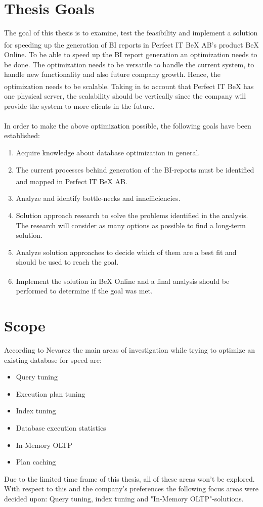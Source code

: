 \documentclass{cslthse-msc}
\newcommand{\bex}{BeX\textsuperscript{\textregistered} }
\begin{document}
\section{Thesis Goals} \label{sec:goals}
The goal of this thesis is to examine, test the feasibility and implement a solution for speeding up the generation of BI reports in Perfect IT \bex AB's product \bex Online. To be able to speed up the BI report generation an optimization needs to be done. The optimization needs to be versatile to handle the current system, to handle new functionality and also future company growth. Hence, the optimization needs to be scalable. Taking in to account that Perfect IT \bex has one physical server, the scalability should be vertically \cite{scalability} since the company will provide the system to more clients in the future.\\\\
In order to make the above optimization possible, the following goals have been established:
\begin{enumerate}
\item Acquire knowledge about database optimization in general.
\item The current processes behind generation of the BI-reports must be identified and mapped in Perfect IT \bex AB.
\item Analyze and identify bottle-necks and innefficiencies.
\item Solution approach research to solve the problems identified in the analysis. The research will consider as many options as possible to find a long-term solution.
\item Analyze solution approaches to decide which of them are a best fit and should be used to reach the goal.
\item Implement the solution in \bex Online and a final analysis should be performed to determine if the goal was met.
\end{enumerate}
  
\section{Scope} \label{sec:scope}
According to Nevarez \cite{Nevarez} the main areas of investigation while trying to optimize an existing database for speed are:
\begin{itemize}
\item Query tuning
\item Execution plan tuning
\item Index tuning
\item Database execution statistics
\item In-Memory OLTP
\item Plan caching
\end{itemize}
Due to the limited time frame of this thesis, all of these areas won't be explored. With respect to this and the company's preferences the following focus areas were decided upon: Query tuning, index tuning and "In-Memory OLTP"-solutions.
\end{document}
